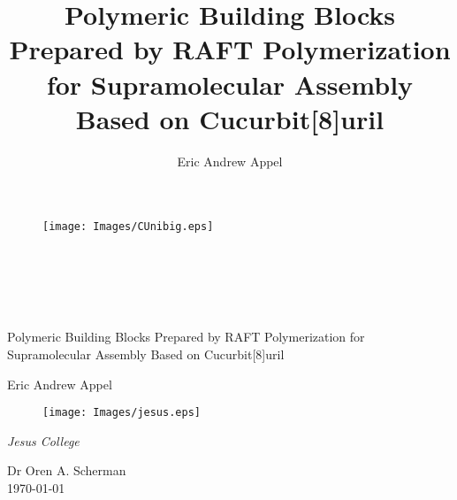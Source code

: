 \documentclass[a4paper,12pt]{report} %
\title{Polymeric Building Blocks Prepared by RAFT Polymerization for Supramolecular Assembly Based on Cucurbit[8]uril}
\author{Eric Andrew Appel}
\begin{document}
\begin{titlepage}


\begin{figure}[h]
\begin{flushright}
\texttt{[image: Images/CUnibig.eps]}
\end{flushright}
\end{figure}
\begin{flushright}
 \\
 \\
 \\
 \\
\end{flushright}

\vspace*{0.5cm}
\begin{center}
\Huge {Polymeric Building Blocks Prepared by RAFT Polymerization for Supramolecular Assembly Based on Cucurbit[8]uril}
\end{center}
\vspace{0.75cm}
\begin{center}
\Large {Eric Andrew Appel} \\[3pt]
\end{center}


\begin{figure}[h]
\begin{center}
\texttt{[image: Images/jesus.eps]}
\end{center}
\end{figure}

\vspace{-1.2cm}
\begin{center}
\Large {\it Jesus College}\\
\end{center}

\vspace{0.25cm}
\begin{center}
\Large {Dr Oren A. Scherman}\\
\today
\end{center}


\end{titlepage}



\end{document}
